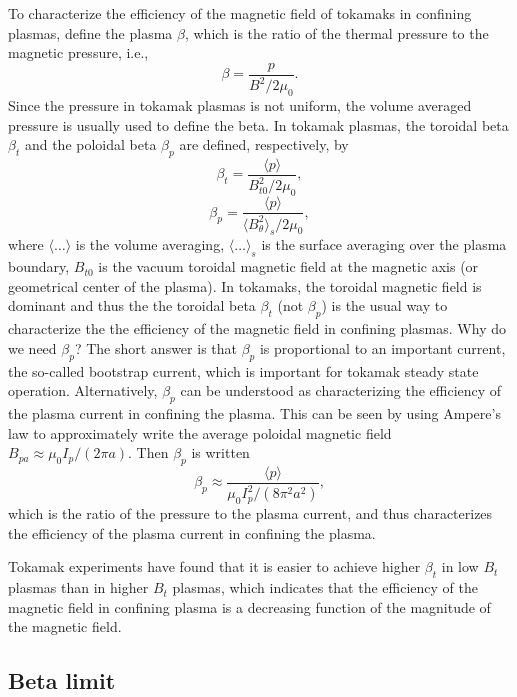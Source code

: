 \documentclass{llncs}
\begin{document}
To characterize the efficiency of the magnetic field of tokamaks in confining
plasmas, define the plasma $\beta$, which is the ratio of the thermal pressure
to the magnetic pressure, i.e.,
\begin{equation}
  \beta = \frac{p}{B^2 / 2 \mu_0} .
\end{equation}
Since the pressure in tokamak plasmas is not uniform, the volume averaged
pressure is usually used to define the beta. In tokamak plasmas, the toroidal
beta $\beta_t$ and the poloidal beta $\beta_p$ are defined, respectively, by
\begin{equation}
  \beta_t = \frac{\langle p \rangle}{B^2_{t 0} / 2 \mu_0},
\end{equation}
\begin{equation}
  \beta_p = \frac{\langle p \rangle}{\langle B_{\theta}^2 \rangle_s / 2
  \mu_0},
\end{equation}
where $\langle \ldots \rangle$ is the volume averaging, $\langle \ldots
\rangle_s$ is the surface averaging over the plasma boundary, $B_{t 0}$ is the
vacuum toroidal magnetic field at the magnetic axis (or geometrical center of
the plasma). In tokamaks, the toroidal magnetic field is dominant and thus the
the toroidal beta $\beta_t$ (not $\beta_p$) is the usual way to characterize
the the efficiency of the magnetic field in confining plasmas. Why do we need
$\beta_p$? The short answer is that $\beta_p$ is proportional to an important
current, the so-called bootstrap current, which is important for tokamak
steady state operation. Alternatively, $\beta_p$ can be understood as
characterizing the efficiency of the plasma current in confining the plasma.
This can be seen by using Ampere's law to approximately write the average
poloidal magnetic field $B_{p a} \approx \mu_0 I_p / (2 \pi a)$. Then
$\beta_p$ is written
\begin{equation}
  \label{7-25-1m} \beta_p \approx \frac{\langle p \rangle}{\mu_0 I_p^2 / (8
  \pi^2 a^2)},
\end{equation}
which is the ratio of the pressure to the plasma current, and thus
characterizes the efficiency of the plasma current in confining the plasma.

Tokamak experiments have found that it is easier to achieve higher $\beta_t$
in low $B_t$ plasmas than in higher $B_t$ plasmas, which indicates that the
efficiency of the magnetic field in confining plasma is a decreasing function
of the magnitude of the magnetic field.

\subsection{Beta limit}
\end{document}
